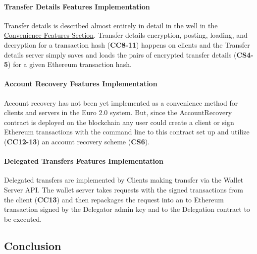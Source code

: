 \documentclass[a4paper,12pt]{article} %
\begin{document}
{\paragraph*{Transfer Details Features Implementation}
Transfer details is described almost entirely in detail in the well in the \hyperref[sssec:3.3:convenience]{Convenience Features Section}. Transfer details encryption, posting, loading, and decryption for a transaction hash (\textbf{CC8-11}) happens on clients and the Transfer details server simply saves and loads the pairs of encrypted transfer details (\textbf{CS4-5}) for a given Ethereum transaction hash.

\paragraph*{Account Recovery Features Implementation}
Account recovery has not been yet implemented as a convenience method for clients and servers in the Euro 2.0 system. But, since the AccountRecovery contract is deployed on the blockchain any user could create a client or sign Ethereum transactions with the command line to this contract set up and utilize (\textbf{CC12-13}) an account recovery scheme (\textbf{CS6}).

\paragraph*{Delegated Transfers Features Implementation}
Delegated transfers are implemented by Clients making transfer via the Wallet Server API. The wallet server takes requests with the signed transactions from the client (\textbf{CC13}) and then repackages the request into an to Ethereum transaction signed by the Delegator admin key and to the Delegation contract to be executed.

\subsection{Conclusion} \label{ssec:3.7}

}
\end{document}
